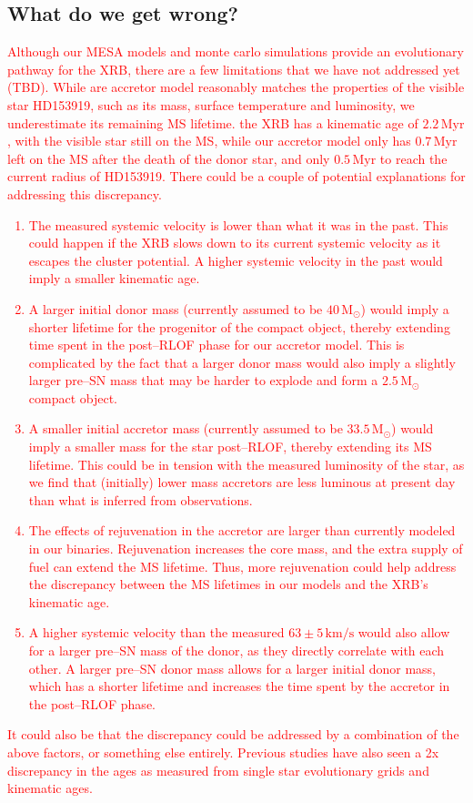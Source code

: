 \documentclass[linenumbers,trackchanges,twocolumn]{aastex701}
\newcommand{\Mdot}{\mathrm{M}_{\odot}}
\newcommand{\red}{\textcolor{red}}
\begin{document}
\subsection{What do we get wrong?}

\red{Although our MESA models and monte carlo simulations provide an evolutionary pathway for the XRB, there are a few limitations that we have not addressed yet (TBD). While are accretor model reasonably matches the properties of the visible star HD153919, such as its mass, surface temperature and luminosity, we underestimate its remaining MS lifetime. the XRB has a kinematic age of $2.2\,\mathrm{Myr}$, with the visible star still on the MS, while our accretor model only has $0.7\,\mathrm{Myr}$ left on the MS after the death of the donor star, and only $0.5\,\mathrm{Myr}$ to reach the current radius of HD153919. There could be a couple of potential explanations for addressing this discrepancy.}

\red{
\begin{enumerate}
    \item The measured systemic velocity is lower than what it was in the past. This could happen if the XRB slows down to its current systemic velocity as it escapes the cluster potential. A higher systemic velocity in the past would imply a smaller kinematic age.
    \item A larger initial donor mass (currently assumed to be $40\,\Mdot$) would imply a shorter lifetime for the progenitor of the compact object, thereby extending time spent in the post--RLOF phase for our accretor model. This is complicated by the fact that a larger donor mass would also imply a slightly larger pre--SN mass that may be harder to explode and form a $2.5\,\Mdot$ compact object.
    \item A smaller initial accretor mass (currently assumed to be $33.5\,\Mdot$) would imply a smaller mass for the star post--RLOF, thereby extending its MS lifetime. This could be in tension with the measured luminosity of the star, as we find that (initially) lower mass accretors are less luminous at present day than what is inferred from observations.
    \item The effects of rejuvenation in the accretor are larger than currently modeled in our binaries. Rejuvenation increases the core mass, and the extra supply of fuel can extend the MS lifetime. Thus, more rejuvenation could help address the discrepancy between the MS lifetimes in our models and the XRB's kinematic age.
    \item A higher systemic velocity than the measured $63\pm 5\, \mathrm{km/s}$ would also allow for a larger pre--SN mass of the donor, as they directly correlate with each other. A larger pre--SN donor mass allows for a larger initial donor mass, which has a shorter lifetime and increases the time spent by the accretor in the post--RLOF phase. 
\end{enumerate}
}
\red{It could also be that the discrepancy could be addressed by a combination of the above factors, or something else entirely. Previous studies have also seen a 2x discrepancy in the ages as measured from single star evolutionary grids and kinematic ages.}
\end{document}
